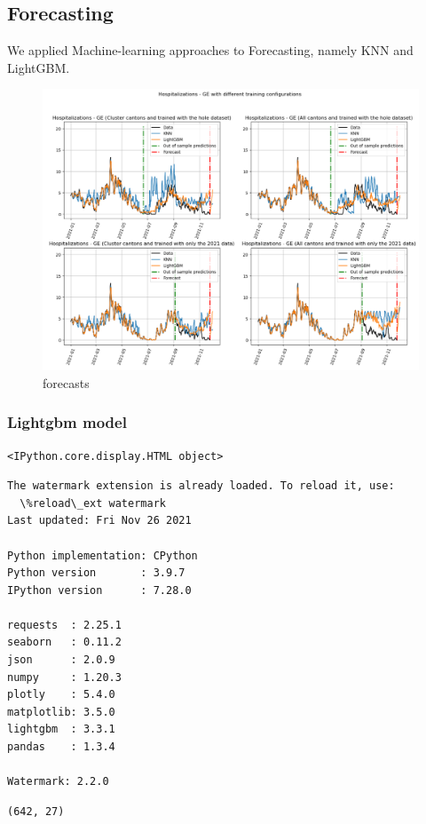 \documentclass[11pt]{article}
\begin{document}
    
    
    \hypertarget{forecasting}{%
\subsection{Forecasting}\label{forecasting}}

We applied Machine-learning approaches to Forecasting, namely KNN and
LightGBM.

\begin{figure}
\centering
\includegraphics{forecasts.png}
\caption{forecasts}
\end{figure}

    \hypertarget{lightgbm-model}{%
\subsubsection{Lightgbm model}\label{lightgbm-model}}

    
    \begin{Verbatim}[commandchars=\\\{\}]
<IPython.core.display.HTML object>
    \end{Verbatim}

    
    \begin{Verbatim}[commandchars=\\\{\}]
The watermark extension is already loaded. To reload it, use:
  \%reload\_ext watermark
Last updated: Fri Nov 26 2021

Python implementation: CPython
Python version       : 3.9.7
IPython version      : 7.28.0

requests  : 2.25.1
seaborn   : 0.11.2
json      : 2.0.9
numpy     : 1.20.3
plotly    : 5.4.0
matplotlib: 3.5.0
lightgbm  : 3.3.1
pandas    : 1.3.4

Watermark: 2.2.0

    \end{Verbatim}

            \begin{tcolorbox}[breakable, size=fbox, boxrule=.5pt, pad at break*=1mm, opacityfill=0]
\begin{Verbatim}[commandchars=\\\{\}]
(642, 27)
\end{Verbatim}
\end{tcolorbox}
        

    
    
    
\end{document}
